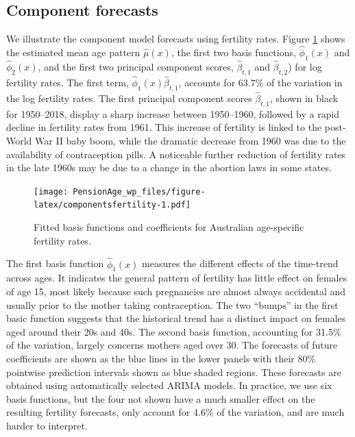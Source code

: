 \documentclass[11pt,a4paper,]{article}
\begin{document}
\hypertarget{component-forecasts}{%
\subsection{Component forecasts}\label{component-forecasts}}

We illustrate the component model forecasts using fertility rates. Figure \ref{fig:componentsfertility} shows the estimated mean age pattern \(\widehat{\mu}(x)\), the first two basis functions, \(\widehat{\phi}_1(x)\) and \(\widehat{\phi}_2(x)\), and the first two principal component scores, \(\widehat{\beta}_{t,1}\) and \(\widehat{\beta}_{t,2}\)) for log fertility rates. The first term, \(\widehat{\phi}_1(x) \widehat{\beta}_{t,1}\), accounts for 63.7\% of the variation in the log fertility rates. The first principal component scores \(\widehat{\beta}_{t,1}\), shown in black for 1950--2018, display a sharp increase between 1950--1960, followed by a rapid decline in fertility rates from 1961. This increase of fertility is linked to the post-World War II baby boom, while the dramatic decrease from 1960 was due to the availability of contraception pills. A noticeable further reduction of fertility rates in the late 1960s may be due to a change in the abortion laws in some states.

\begin{figure}
\centering
\texttt{[image: PensionAge\_wp\_files/figure-latex/componentsfertility-1.pdf]}
\caption{\label{fig:componentsfertility}Fitted basis functions and coefficients for Australian age-specific fertility rates.}
\end{figure}

The first basis function \(\widehat{\phi}_1(x)\) measures the different effects of the time-trend across ages. It indicates the general pattern of fertility has little effect on females of age 15, most likely because such pregnancies are almost always accidental and usually prior to the mother taking contraception. The two ``bumps'' in the first basic function suggests that the historical trend has a distinct impact on females aged around their 20s and 40s. The second basis function, accounting for 31.5\% of the variation, largely concerns mothers aged over 30. The forecasts of future coefficients are shown as the blue lines in the lower panels with their 80\% pointwise prediction intervals shown as blue shaded regions. These forecasts are obtained using automatically selected ARIMA models. In practice, we use six basis functions, but the four not shown have a much smaller effect on the resulting fertility forecasts, only account for 4.6\% of the variation, and are much harder to interpret.
\end{document}
